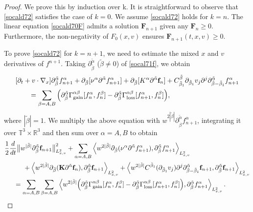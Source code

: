 \documentclass[reqno]{amsart}
\numberwithin{equation}{section}
\numberwithin{equation}{section}
\begin{document}
	\begin{proof}
		We prove this by induction over k. ‌It is straightforward to observe that \eqref{socald72} satisfies the case of $k=0$. We assume \eqref{socald72} holds for $k=n$. The linear equation \eqref{socald70F} admits a solution $\mathbf{F}_{n+1}$ given any $\mathbf{F}_{n} \ge 0$. Furthermore, the non-negativity of $F_0(x, v)$ ensures $\mathbf{F}_{n+1}(t, x, v) \ge 0$.
		
		To prove \eqref{socald72} for $k = n+1$, we need to estimate the mixed $x$ and $v$ derivatives of $f^{n+1}$. Taking $\partial_{\tilde{\beta}}^{\tilde{\alpha}}$ ($\tilde{\beta} \ne 0$) of \eqref{socal71f}, we obtain
		\[
		\begin{aligned}
			&[\partial_t + v \cdot \nabla_x]\partial_{\tilde{\beta}}^{\tilde{\alpha}} f_{n+1}^{\alpha} + \partial_{\tilde{\beta}}[\nu^{\alpha}\partial^{\tilde{\alpha}} f_{n+1}^{\alpha}] + \partial_{\tilde{\beta}}[K^{\alpha}\partial^{\tilde{\alpha}} \mathbf{f}_n] + C^{\tilde{\beta}}_{\tilde{\beta}_1}\partial_{\tilde{\beta}_1}v_j\partial^j \partial^{\tilde{\alpha}}_{\tilde{\beta}-\tilde{\beta}_1} f_{n+1}^{\alpha}\\
			&\hspace{0.7cm}=\sum_{\beta=A,B}\Big( \partial_{\tilde{\beta}}^{\tilde{\alpha}}\Gamma^{\alpha\beta}_{\text{gain}}[f_n^{\alpha}, f_n^{\beta}] - \partial_{\tilde{\beta}}^{\tilde{\alpha}}\Gamma^{\alpha\beta}_{\text{loss}}[f_{n+1}^{\alpha}, f_{n}^{\beta}]\Big),
		\end{aligned}
		\]
		where \(|\tilde{\beta}| = 1\). We multiply the above equation with \(w^{2|\tilde{\beta}|}\partial_{\tilde{\beta}}^{\tilde{\alpha}} f^{\alpha}_{n+1}\), integrating it over \(\mathbb{T}^3 \times \mathbb{R}^3\)  and then sum over $\alpha=A,B$ to obtain
		\begin{align}
			&\frac{1}{2}\frac{d}{dt}\big\|w^{|\tilde{\beta}|}\partial_{\tilde{\beta}}^{\tilde{\alpha}} \mathbf{f}_{n+1}\big\|^2_{L^{2}_{x,v}} + \sum_{\alpha=A,B}\left\langle w^{2|\tilde{\beta}|}\partial_{\tilde{\beta}} (\nu^{\alpha}\partial^{\tilde{\alpha}} f_{n+1}^{\alpha}), \partial_{\tilde{\beta}}^{\tilde{\alpha}} f_{n+1}^{\alpha} \right\rangle_{L^{2}_{x,v}} \notag\\
			&\hspace{1cm}+ \left\langle w^{2|\tilde{\beta}|}\partial_{\tilde{\beta}} (\mathbf{K}\partial^{\tilde{\alpha}} \mathbf{f}_n), \partial_{\tilde{\beta}}^{\tilde{\alpha}} \mathbf{f}_{n+1}\right\rangle_{L^{2}_{x,v}} + \left\langle w^{2|\tilde{\beta}|}C^{\tilde{\beta}_1}(\partial_{\tilde{\beta}_1}v_j)\partial^j \partial^{\tilde{\alpha}}_{\tilde{\beta}-\tilde{\beta}_1} \mathbf{f}_{n+1}, \partial_{\tilde{\beta}}^{\tilde{\alpha}} \mathbf{f}_{n+1}\right\rangle_{L^{2}_{x,v}} \notag\\
			&\hspace{0.5cm}= \sum_{\alpha=A,B}\sum_{\beta=A,B}\left\langle w^{2|\tilde{\beta}|}\Big( \partial_{\tilde{\beta}}^{\tilde{\alpha}}\Gamma^{\alpha\beta}_{\text{gain}}[f_n^{\alpha}, f_n^{\beta}] - \partial_{\tilde{\beta}}^{\tilde{\alpha}}\Gamma^{\alpha\beta}_{\text{loss}}[f_{n+1}^{\alpha}, f_{n}^{\beta}]\Big), \partial_{\tilde{\beta}}^{\tilde{\alpha}} f^{\alpha}_{n+1}\right\rangle_{L^{2}_{x,v}}.\label{socald73}
		\end{align}
		

\end{proof}
\end{document}
